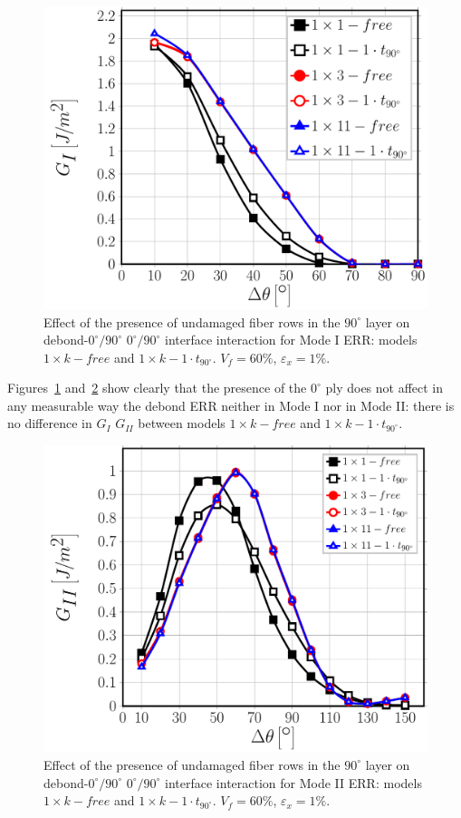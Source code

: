 \documentclass[review]{elsarticle}
\begin{document}
\begin{figure}[!h]
\centering
\includegraphics[width=\textwidth]{1xk-1-vf60-GI.pdf}
\caption{Effect of the presence of undamaged fiber rows in the $90^{\circ}$ layer on debond-$0^{\circ}/90^{\circ}$ $0^{\circ}/90^{\circ}$ interface interaction for Mode I ERR: models $1\times k-free$ and $1\times k-1\cdot t_{90^{\circ}}$. $V_{f}=60\%$, $\varepsilon_{x}=1\%$.}\label{fig:1kGI}
\end{figure}

Figures~\ref{fig:1kGI} and~\ref{fig:1kGII} show clearly that the presence of the $0^{\circ}$ ply does not affect in any measurable way the debond ERR neither in Mode I nor in Mode II: there is no difference in $G_{I}$ $G_{II}$ between models $1\times k-free$ and $1\times k-1\cdot t_{90^{\circ}}$.

\begin{figure}[!h]
\centering
\includegraphics[width=\textwidth]{1xk-1-vf60-GII.pdf}
\caption{Effect of the presence of undamaged fiber rows in the $90^{\circ}$ layer on debond-$0^{\circ}/90^{\circ}$ $0^{\circ}/90^{\circ}$ interface interaction for Mode II ERR: models $1\times k-free$ and $1\times k-1\cdot t_{90^{\circ}}$. $V_{f}=60\%$, $\varepsilon_{x}=1\%$.}\label{fig:1kGII}
\end{figure}
\end{document}
